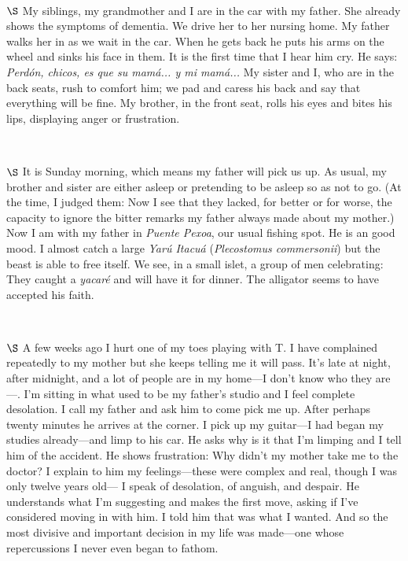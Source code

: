 \documentclass[a4paper, 12pt]{article}
\begin{document}
~ 

$\S$ My siblings, my grandmother and I are in the car with my father. She
already shows the symptoms of dementia. We drive her to her nursing home. My
father walks her in as we wait in the car. When he gets back he puts his arms
on the wheel and sinks his face in them. It is the first time that I hear
him cry. He says: \textit{Perdón, chicos, es que su mamá... y mi mamá...} My
sister and I, who are in the back seats, rush to comfort him; we pad and caress
his back and say that everything will be fine. My brother, in the front seat,
rolls his eyes and bites his lips, displaying anger or frustration.

~

$\S$ It is Sunday morning, which means my father will pick us up. As usual, my
brother and sister are either asleep or pretending to be asleep so as not to
go. (At the time, I judged them: Now I see that they lacked, for better or for
worse, the capacity to ignore the bitter remarks my father always made
about my mother.) Now I am with my father in \textit{Puente Pexoa}, our usual
fishing spot. He is an good mood. I almost catch a large \textit{Yarú Itacuá}
(\textit{Plecostomus commersonii}) but the beast is able to free itself. We
see, in a small islet, a group of men celebrating: They caught a
\textit{yacaré} and will have it for dinner. The alligator seems to
have accepted his faith.

~ 

$\S$ A few weeks ago I hurt one of my toes playing with T. I have complained
repeatedly to my mother but she keeps telling me it will pass. It's late at
night, after midnight, and a lot of people are in my home---I don't know who
they are---. I'm sitting in what used to be my father's studio and I feel
complete desolation. I call my father and ask him to come pick me up. After
perhaps twenty minutes he arrives at the corner. I pick up
my guitar---I had began my studies already---and limp to his car. He asks why
is it that I'm limping and I tell him of the accident. He shows frustration: Why didn't my mother take me to the doctor? I explain to him my
feelings---these were complex and real, though I was only twelve years old--- I
speak of desolation, of anguish, and despair. He understands what I'm
suggesting and makes the first move, asking if I've considered moving in with
him. I told him that was what I wanted. And so the most divisive and important
decision in my life was made---one whose repercussions I never even began to
fathom.
\end{document}
